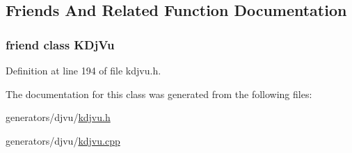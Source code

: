 \subsection{Friends And Related Function Documentation}
\hypertarget{classKDjVu_1_1TextEntity_a4241ce0336d22245ffdb13dd5cb6edcc}{
\subsubsection[{K\+Dj\+Vu}]{\setlength{\rightskip}{0pt plus 5cm}friend class {\bf K\+Dj\+Vu}\hspace{0.3cm}{\ttfamily [friend]}}}\label{classKDjVu_1_1TextEntity_a4241ce0336d22245ffdb13dd5cb6edcc}


Definition at line 194 of file kdjvu.\+h.



The documentation for this class was generated from the following files\+:\begin{DoxyCompactItemize}
\item 
generators/djvu/\hyperlink{kdjvu_8h}{kdjvu.\+h}\item 
generators/djvu/\hyperlink{kdjvu_8cpp}{kdjvu.\+cpp}\end{DoxyCompactItemize}
